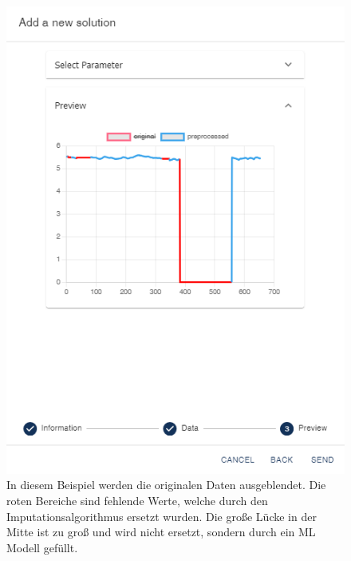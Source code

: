 \begin{figure}[ht]
\begin{minipage}{0.5\textwidth}
        \includegraphics[width=\linewidth]{includes/figures/new_version/data_processing_3.png}
        \caption{In diesem Beispiel werden die originalen Daten ausgeblendet. Die roten Bereiche sind fehlende Werte, welche durch den Imputationsalgorithmus ersetzt wurden. Die große Lücke in der Mitte ist zu groß und wird nicht ersetzt, sondern durch ein ML Modell gefüllt.}
        \label{fig:configuration_graph_overview2}
    \end{minipage}
\end{figure}




